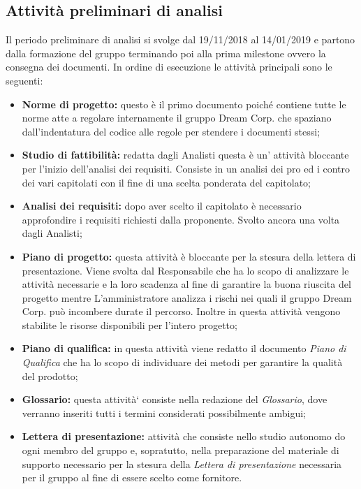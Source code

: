 	\subsection{Attività preliminari di analisi}
	Il periodo preliminare di analisi si svolge dal 19/11/2018 al 14/01/2019 e partono dalla formazione del gruppo terminando poi alla prima milestone ovvero la consegna dei documenti. \newline
 	In ordine di esecuzione le attività principali sono le seguenti:
	\begin{itemize}
		\item{\textbf{Norme di progetto:} questo è il primo documento poiché contiene tutte le norme atte a regolare internamente il gruppo Dream Corp. che spaziano dall'indentatura del codice alle regole per stendere i documenti stessi;}
		\item{\textbf{Studio di fattibilità:} redatta dagli Analisti questa è un' attività bloccante per l'inizio dell'analisi dei requisiti. Consiste in un analisi dei pro ed i contro dei vari capitolati con il fine di una scelta ponderata del capitolato;}
		\item{\textbf{Analisi dei requisiti:} dopo aver scelto il capitolato è necessario approfondire i requisiti richiesti dalla proponente. Svolto ancora una volta dagli Analisti;}
		\item{\textbf{Piano di progetto:} questa attività è bloccante per la stesura della lettera di presentazione. Viene svolta dal Responsabile che ha lo scopo di analizzare le attività necessarie e la loro scadenza al fine di garantire la  buona riuscita del progetto mentre L'amministratore analizza i rischi nei quali il gruppo Dream Corp. può incombere durate il percorso. Inoltre in questa attività vengono stabilite le risorse disponibili per l'intero progetto;}
		\item{\textbf{Piano di qualifica:} in questa attività viene redatto il documento \textit{Piano di Qualifica} che ha lo scopo di individuare dei metodi per garantire la qualità del prodotto;}
		\item{\textbf{Glossario:} questa attività` consiste nella redazione del \textit{Glossario}, dove verranno inseriti tutti i termini considerati possibilmente ambigui;} 
		\item{\textbf{Lettera di presentazione:} attività che consiste nello studio autonomo do ogni membro del gruppo e, sopratutto, nella preparazione del materiale di supporto necessario per la stesura della \textit{Lettera di presentazione} necessaria per il gruppo al fine di essere scelto come fornitore.}
	\end{itemize}

